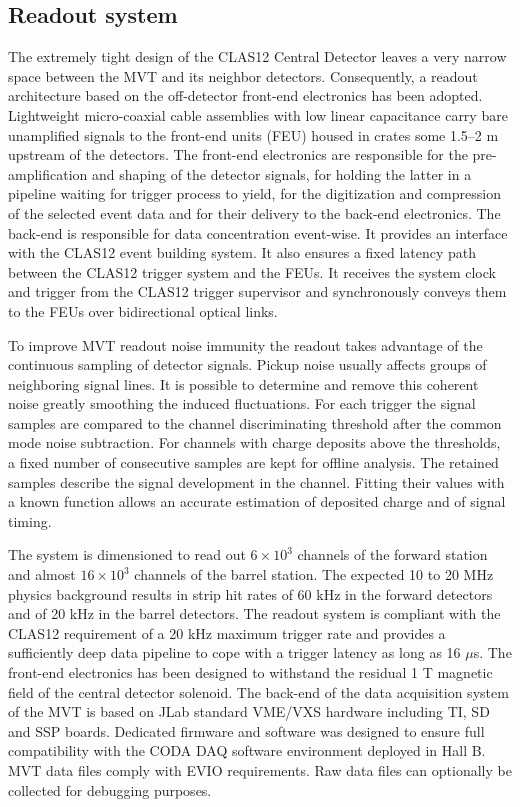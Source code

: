 \subsection{Readout system}

The extremely tight design of the CLAS12 Central Detector leaves a very narrow space between the MVT and its neighbor detectors. Consequently, a readout architecture based on the off-detector front-end electronics has been adopted. Lightweight micro-coaxial cable assemblies with low linear capacitance carry bare unamplified signals to the front-end units (FEU) housed in crates some 1.5--2 m upstream of the detectors. The front-end electronics are responsible for the pre-amplification and shaping of the detector signals, for holding the latter in a pipeline waiting for trigger process to yield, for the digitization and compression of the selected event data and for their delivery to the back-end electronics. The back-end is responsible for data concentration event-wise. It provides an interface with the CLAS12 event building system. It also ensures a fixed latency path between the CLAS12 trigger system and the FEUs. It receives the system clock and trigger from the CLAS12 trigger supervisor and synchronously conveys them to the FEUs over bidirectional optical links.

To improve MVT readout noise immunity the readout takes advantage of the continuous sampling of detector signals. Pickup noise usually affects groups of neighboring signal lines. It is possible to determine and remove this coherent noise greatly smoothing the induced fluctuations. For each trigger the signal samples are compared to the channel discriminating threshold after the common mode noise subtraction. For channels with charge deposits above the thresholds, a fixed number of consecutive samples are kept for offline analysis. The retained samples describe the signal development in the channel. Fitting their values with a known function allows an accurate estimation of deposited charge and of signal timing.

The system is dimensioned to read out $6\times10^3$ channels of the forward station and almost $16\times10^3$ channels of the barrel station. The expected 10 to 20 MHz physics background results in strip hit rates of 60 kHz in the forward detectors and of 20 kHz in the barrel detectors. The readout system is compliant with the CLAS12 requirement of a 20 kHz maximum trigger rate and provides a sufficiently deep data pipeline to cope with a trigger latency as long as 16 $\mu$s. The front-end electronics has been designed to withstand the residual 1 T magnetic field of the central detector solenoid.
The back-end of the data acquisition system of the MVT is based on JLab standard VME/VXS hardware including TI, SD and SSP boards. Dedicated firmware and software was designed to ensure full compatibility with the CODA DAQ software environment deployed in Hall B. MVT data files comply with EVIO requirements. Raw data files can optionally be collected for debugging purposes.